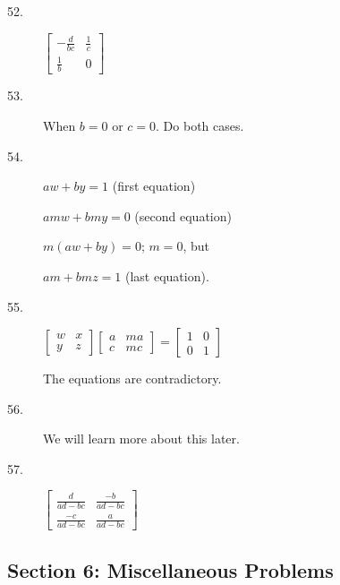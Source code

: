 \documentclass{article}
\begin{document}
\begin{description}
  \item[52.] $\begin{bmatrix} -\frac{d}{bc} & \frac{1}{c} \\ \frac{1}{b} & 0 \end{bmatrix}$

  \item[53.] When $b=0$ or $c=0$. Do both cases.

  \item[54.] $aw + by = 1$ (first equation)

    $amw +bmy = 0$ (second equation)

    $m(aw +by) = 0$; $m=0$, but

    $am +bmz = 1$ (last equation).

  \item[55.] $\begin{bmatrix} w & x \\ y & z \end{bmatrix}  \begin{bmatrix} a & ma \\ c & mc \end{bmatrix}  =  \begin{bmatrix} 1 & 0 \\ 0 & 1 \end{bmatrix}$

    The equations are contradictory.

  \item[56.] We will learn more about this later. 

  \item[57.] $\begin{bmatrix} \frac{d}{ad-bc} & \frac{-b}{ad-bc} \\ \frac{-c}{ad-bc} & \frac{a}{ad-bc} \end{bmatrix}$

\end{description}


\subsection*{Section 6: Miscellaneous Problems}
\end{document}
